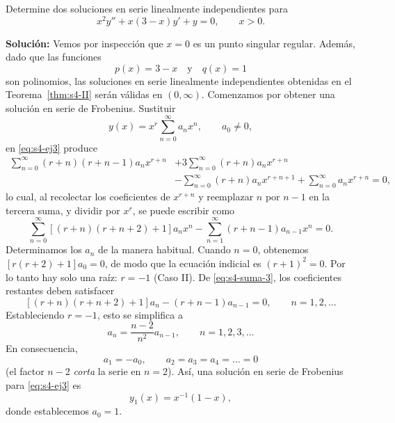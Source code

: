 \begin{example}\label{ex:s4-log}
    Determine dos soluciones en serie linealmente independientes para
\begin{equation}
x^2 y'' + x(3 - x)y' + y = 0, \qquad x > 0.
\label{eq:s4-ej3}
\end{equation}
 
\noindent \textbf{Solución:} \quad Vemos por inspección que $x = 0$ es un punto singular regular. Además, dado que las funciones
\[ p(x) = 3 - x \quad \text{y} \quad q(x) = 1 \]
son polinomios, las soluciones en serie linealmente independientes obtenidas en el Teorema~\ref{thm:s4-II} serán válidas en $(0, \infty)$. Comenzamos por obtener una solución en serie de Frobenius. Sustituir
\[ y(x) = x^r \sum_{n=0}^{\infty} a_n x^n, \qquad a_0 \neq 0, \]
en \eqref{eq:s4-ej3} produce
\begin{align*}
\sum_{n=0}^{\infty} (r + n)(r + n - 1)a_n x^{r+n} &+ 3\sum_{n=0}^{\infty} (r + n)a_n x^{r+n} \\
&- \sum_{n=0}^{\infty} (r + n)a_n x^{r+n+1} + \sum_{n=0}^{\infty} a_n x^{r+n} = 0,
\end{align*}
lo cual, al recolectar los coeficientes de $x^{r+n}$ y reemplazar $n$ por $n - 1$ en la tercera suma, y dividir por $x^r$, se puede escribir como
\begin{equation}
\sum_{n=0}^{\infty} [(r + n)(r + n + 2) + 1]a_n x^n - \sum_{n=1}^{\infty} (r + n - 1)a_{n-1} x^n = 0.
\label{eq:s4-suma-3}
\end{equation}
Determinamos los $a_n$ de la manera habitual. Cuando $n = 0$, obtenemos $[r(r + 2) + 1]a_0 = 0$, de modo que la ecuación indicial es $(r + 1)^2 = 0$. Por lo tanto hay solo una raíz: $r = -1$ (Caso II). De \eqref{eq:s4-suma-3}, los coeficientes restantes deben satisfacer
\[ [(r + n)(r + n + 2) + 1]a_n - (r + n - 1)a_{n-1} = 0, \qquad n = 1, 2, \dots \]
Estableciendo $r = -1$, esto se simplifica a
\[ a_n = \frac{n - 2}{n^2}a_{n-1}, \qquad n = 1, 2, 3, \dots \]
En consecuencia,
\[ a_1 = -a_0, \qquad a_2 = a_3 = a_4 = \dots = 0 \]
(el factor $n-2$ \emph{corta} la serie en $n=2$). Así, una solución en serie de Frobenius para \eqref{eq:s4-ej3} es
\begin{equation}
y_1(x) = x^{-1}(1 - x),
\label{eq:s4-y1}
\end{equation}
donde establecemos $a_0 = 1$.
 

\end{example}
